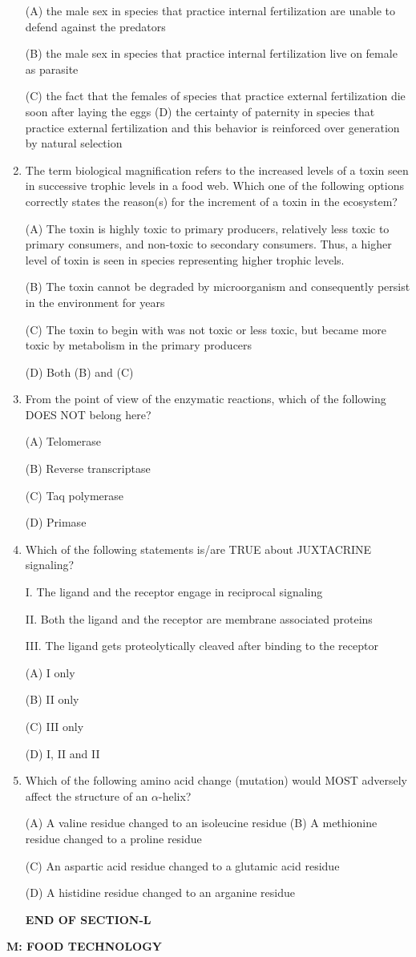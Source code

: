 \documentclass[journal]{IEEEtran}
\begin{document}
\begin{enumerate}
{(A) the male sex in species that practice internal fertilization are unable to defend against the predators

(B) the male sex in species that practice internal fertilization live on female as parasite

(C) the fact that the females of species that practice external fertilization die soon after laying the eggs
(D) the certainty of paternity in species that practice external fertilization and this behavior is reinforced over generation by natural selection
}
\item{ The term biological magnification refers to the increased levels of a toxin seen in successive trophic levels in a food web. Which one of the following options correctly states the reason(s) for the increment of a toxin in the ecosystem?

(A) The toxin is highly toxic to primary producers, relatively less toxic to primary consumers, and non-toxic to secondary consumers. Thus, a higher level of toxin is seen in species representing higher trophic levels.

(B) The toxin cannot be degraded by microorganism and consequently persist in the environment for years

(C) The toxin to begin with was not toxic or less toxic, but became more toxic by metabolism in the primary producers

(D) Both (B) and (C)
}
\item {From the point of view of the enzymatic reactions, which of the following DOES NOT belong here?

(A) Telomerase

(B) Reverse transcriptase

(C) Taq polymerase

(D) Primase
}
\item{ Which of the following statements is/are TRUE about JUXTACRINE signaling?

I. The ligand and the receptor engage in reciprocal signaling

II. Both the ligand and the receptor are membrane associated proteins

III. The ligand gets proteolytically cleaved after binding to the receptor

(A) I only

(B) II only

(C) III only

(D) I, II and II
}
\item{ Which of the following amino acid change (mutation) would MOST adversely affect the structure of an $\alpha$-helix?

(A) A valine residue changed to an isoleucine residue 
(B) A methionine residue changed to a proline residue

(C) An aspartic acid residue changed to a glutamic acid residue

(D) A histidine residue changed to an arganine residue
}
\begin{center}
\textbf{END OF SECTION-L}
\end{center}
\end{enumerate}
\newpage
\textbf{M: FOOD TECHNOLOGY}
\end{document}
